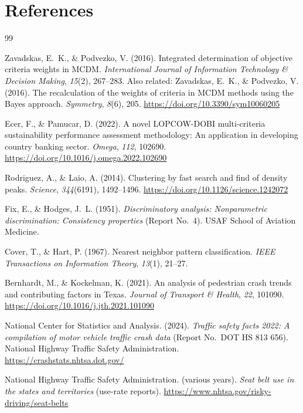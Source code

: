 \documentclass{article}
\begin{document}
\section*{References}
\begin{thebibliography}{99}

Zavadskas, E.~K., \& Podvezko, V. (2016).
Integrated determination of objective criteria weights in MCDM.
\textit{International Journal of Information Technology \& Decision Making}, \textit{15}(2), 267--283.
Also related: Zavadskas, E.~K., \& Podvezko, V. (2016).
The recalculation of the weights of criteria in MCDM methods using the Bayes approach.
\textit{Symmetry}, \textit{8}(6), 205.
\url{https://doi.org/10.3390/sym10060205}

Ecer, F., \& Pamucar, D. (2022).
A novel LOPCOW-DOBI multi-criteria sustainability performance assessment methodology: An application in developing country banking sector.
\textit{Omega}, \textit{112}, 102690.
\url{https://doi.org/10.1016/j.omega.2022.102690}

Rodriguez, A., \& Laio, A. (2014).
Clustering by fast search and find of density peaks.
\textit{Science}, \textit{344}(6191), 1492--1496.
\url{https://doi.org/10.1126/science.1242072}

Fix, E., \& Hodges, J.~L. (1951).
\textit{Discriminatory analysis: Nonparametric discrimination: Consistency properties}
(Report No.\ 4). USAF School of Aviation Medicine.

Cover, T., \& Hart, P. (1967).
Nearest neighbor pattern classification.
\textit{IEEE Transactions on Information Theory}, \textit{13}(1), 21--27.

Bernhardt, M., \& Kockelman, K. (2021).
An analysis of pedestrian crash trends and contributing factors in Texas.
\textit{Journal of Transport \& Health}, \textit{22}, 101090.
\url{https://doi.org/10.1016/j.jth.2021.101090}

National Center for Statistics and Analysis. (2024).
\textit{Traffic safety facts 2022: A compilation of motor vehicle traffic crash data}
(Report No.\ DOT HS 813 656).
National Highway Traffic Safety Administration.
\url{https://crashstats.nhtsa.dot.gov/}

National Highway Traffic Safety Administration. (various years).
\textit{Seat belt use in the states and territories} (use-rate reports).
\url{https://www.nhtsa.gov/risky-driving/seat-belts}


\end{thebibliography}
\end{document}
